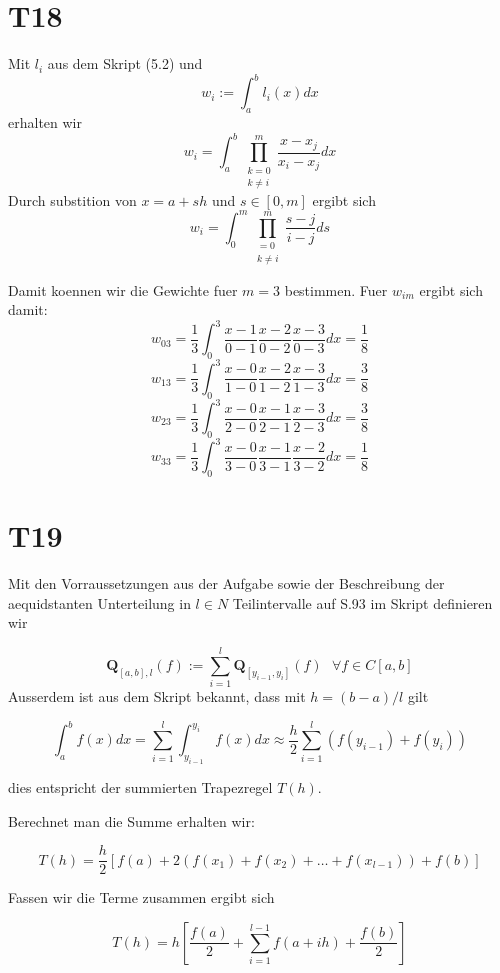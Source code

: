 \documentclass[a4paper,12pt]{article}
\begin{document}
\section{T18}
Mit $l_i$ aus dem Skript (5.2) und
\[ w_i := \int_a^b l_i(x) dx \]
erhalten wir
\[ w_i = \int_a^b \prod\limits_{\substack{k=0 \\ k\neq i}}^m \frac{x-x_j}{x_i-x_j} dx \]
Durch substition von $x = a + sh$ und $s \in [0,m]$ ergibt sich
\[ w_i = \int_0^m \prod\limits_{\substack{=0 \\ k\neq i}}^m \frac{s-j}{i-j} ds \]

Damit koennen wir die Gewichte fuer $m = 3$ bestimmen. Fuer $w_{im}$ ergibt sich damit:
\[ w_{03} = \frac{1}{3} \int_0^3 \frac{x-1}{0-1} \frac{x-2}{0-2} \frac{x-3}{0-3} dx = \frac{1}{8} \]
\[ w_{13} = \frac{1}{3} \int_0^3 \frac{x-0}{1-0} \frac{x-2}{1-2} \frac{x-3}{1-3} dx = \frac{3}{8} \]
\[ w_{23} = \frac{1}{3} \int_0^3 \frac{x-0}{2-0} \frac{x-1}{2-1} \frac{x-3}{2-3} dx = \frac{3}{8} \]
\[ w_{33} = \frac{1}{3} \int_0^3 \frac{x-0}{3-0} \frac{x-1}{3-1} \frac{x-2}{3-2} dx = \frac{1}{8} \]

\section{T19}

Mit den Vorraussetzungen aus der Aufgabe sowie der Beschreibung der aequidstanten Unterteilung in $l\in N$ Teilintervalle
auf S.93 im Skript definieren wir 

\[\mathbf{Q}_{[a,b],l}(f) := \sum_{i=1}^l \mathbf{Q}_{[y_{i-1}, y_i]}(f) \mbox{ } \forall f \in C[a,b] \]
Ausserdem ist aus dem Skript bekannt, dass mit $h = (b-a)/l$ gilt

\[ \int_a^b f(x) dx = \sum_{i=1}^l \int_{y_{i-1}}^{y_i} f(x) dx \approx \frac{h}{2} \sum_{i=1}^l (f(y_{i-1}) + f(y_i)) \]

dies entspricht der summierten Trapezregel $T(h)$.

Berechnet man die Summe erhalten wir:

\[ T(h) = \frac{h}{2} \left[ f(a) + 2 \left( f(x_1) + f(x_2) + \dots + f(x_{l-1}) \right) + f(b) \right] \]

Fassen wir die Terme zusammen ergibt sich

\[ T(h) = h \left[ \frac{f(a)}{2} + \sum_{i=1}^{l-1} f(a+ih) + \frac{f(b)}{2} \right] \]
\end{document}
